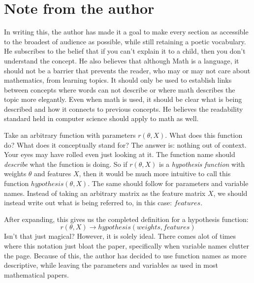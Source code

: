 \chapter*{Note from the author}

In writing this, the author has made it a goal to make every section as accessible to the broadest of audience as possible, while still retaining a poetic vocabulary. He subscribes to the belief that if you can't explain it to a child, then you don't understand the concept. He also believes that although Math is a language, it should not be a barrier that prevents the reader, who may or may not care about mathematics, from learning topics. It should only be used to establish  links between concepts where words can not describe or where math describes the topic more elegantly. Even when math is used, it should be clear what is being described and how it connects to previous concepts. He believes the readability standard held in computer science should apply to math as well.

Take an arbitrary function with parameters $r(\theta, X)$. What does this function do? What does it conceptually stand for? The answer is: nothing out of context. Your eyes may have rolled even just looking at it. The function name should \emph{describe} what the function is doing. So if $r(\theta, X)$ is a \emph{hypothesis function} with weights $\theta$ and features $X$, then it would be much more intuitive to call this function $hypothesis(\theta, X)$. The same should follow for parameters and variable names. Instead of taking an arbitrary matrix as the feature matrix $X$, we should instead write out what is being referred to, in this case: $features$.

After expanding, this gives us the completed definition for a hypothesis function:
\begin{equation}
    r(\theta, X) \rightarrow hypothesis(weights, features)
\end{equation}
Isn't that just magical? However, it is solely ideal. There comes alot of times where this notation just bloat the paper, specifically when variable names clutter the page. Because of this, the author has decided to use function names as more descriptive, while leaving the parameters and variables as used in most mathematical papers.
